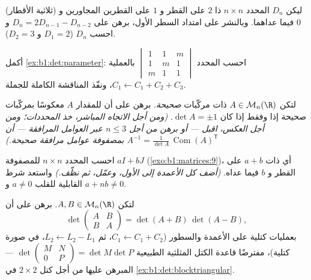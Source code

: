 \begin{exercise}[$\star\star$]\label{exo:b1:det:6}
(ثلاثية الأقطار) ليكن $D_n$ المحدد $n \times n$ ذا $2$ على
القطر و $1$ على القطرين المجاورين و $0$ فيما عداهما.
وبالنشر على امتداد السطر الأول، برهن على $D_n = 2D_{n-1} - D_{n-2}$ و
احسب $D_n$ ($D_1 = 2$ و $D_2 = 3$).
\end{exercise}

\begin{exercise}[$\star\star$]\label{exo:b1:det:7}
أكمل \cref{ex:b1:det:parameter}: احسب المحدد
$\begin{vmatrix} 1 & 1 & m\\ 1 & m & 1\\ m & 1 & 1\end{vmatrix}$
بالعملية $C_1 \leftarrow C_1 + C_2 + C_3$، ونفّذ
المناقشة الكاملة للجملة.
\end{exercise}

\begin{exercise}[$\star\star$]\label{exo:b1:det:8}
لتكن $A \in \mathcal{M}_n(\R)$ ذات مركّبات \emph{صحيحة}. برهن
على أن للمقدار $A$ معكوسًا بمركّبات صحيحة إذا وفقط إذا كان $\det A
= \pm 1$. \emph{(ومن أجل الاتجاه المباشر، خذ المحددات؛ ومن أجل
العكس، اقبل --- أو برهن من أجل $n \leq 3$ عبر العوامل المرافقة --- أن
$A^{-1} = \frac{1}{\det A}\,\operatorname{Com}(A)^{\mathsf T}$ بمصفوفة عوامل
مرافقة صحيحة.)}
\end{exercise}

\begin{exercise}[$\star\star\star$]\label{exo:b1:det:9}
احسب المحدد $n \times n$ للمصفوفة $aI + bJ$
(\cref{exo:b1:matrices:9})، أي ذات $a + b$ على القطر و
$b$ فيما عداه. \emph{(أضف كل الأعمدة إلى الأول، وعمّل، ثم
نظّف.)} واستعد شرط القابلية للقلب $a \neq 0$ و $a + nb
\neq 0$.
\end{exercise}

\begin{exercise}[$\star\star\star$]\label{exo:b1:det:10}
لتكن $A, B \in \mathcal{M}_n(\R)$. برهن على أن
\[
\det\begin{pmatrix} A & B\\ B & A \end{pmatrix}
= \det(A + B)\,\det(A - B),
\]
بعمليات كتلية على الأعمدة والسطور ($C_1 \leftarrow C_1 + C_2$، ثم
$L_2 \leftarrow L_2 - L_1$، في صورة كتلية)، مفترضًا قاعدة الكتل
المثلثية الطبيعية $\det\begin{pmatrix} M & N\\ 0 &
P\end{pmatrix} = \det M \det P$ --- المبرهن عليها من أجل كتل $2 \times 2$
في \cref{ex:b1:det:blocktriangular}.
\end{exercise}

